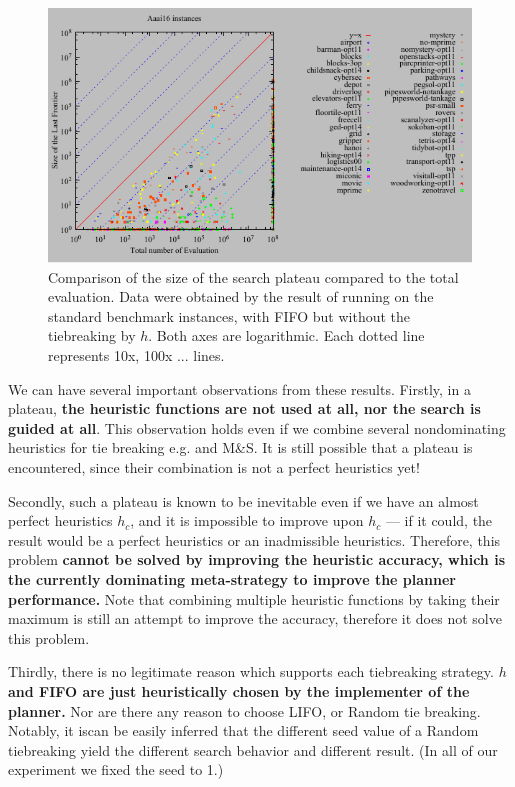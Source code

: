 \begin{figure}[htbp]
 \centering
 \includegraphics{tables/aaai16-front-vs-evaluated.pdf}
 \caption{Comparison of the size of the search plateau compared to the total evaluation. Data were obtained by the result of running \astar on the standard benchmark instances, with FIFO but without the tiebreaking by $h$. Both axes are logarithmic. Each dotted line represents 10x, 100x ... lines.}
 \label{plateau-f}
\end{figure}


We can have several important observations from these results.  Firstly, in a plateau, \textbf{the heuristic functions are not used at all, nor the search is guided at all}. This observation holds even if we combine several nondominating heuristics for tie breaking e.g. \lmcut and M\&S.  It is still possible that a plateau is encountered, since their combination is not a perfect heuristics yet!

Secondly, such a plateau is known to be inevitable even if we have an almost perfect heuristics $h_c$, and it is impossible to improve upon $h_c$ --- if it could, the result would be a perfect heuristics or an inadmissible heuristics. Therefore, this problem \textbf{cannot be solved by improving the heuristic accuracy, which is the currently dominating meta-strategy to improve the planner performance.}  Note that combining multiple heuristic functions by taking their maximum is still an attempt to improve the accuracy, therefore it does not solve this problem.

Thirdly, there is no legitimate reason which supports each tiebreaking strategy. \textbf{$h$ and FIFO are just heuristically chosen by the implementer of the planner.} Nor are there any reason to choose LIFO, or Random tie breaking. Notably, it iscan be easily inferred that the different seed value of a Random tiebreaking yield the different search behavior and different result. (In all of our experiment we fixed the seed to 1.)

